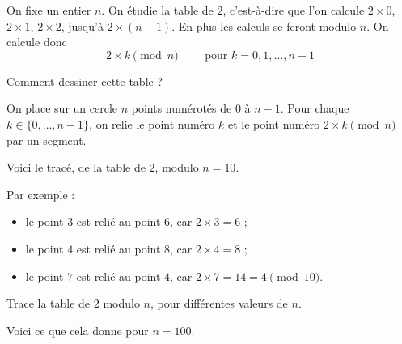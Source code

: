 \documentclass[11pt,class=report,crop=false]{standalone}
\begin{document}
\begin{activite}


On fixe un entier $n$. On étudie la table de $2$, c'est-à-dire 
que l'on calcule $2 \times 0$, $2\times 1$, $2 \times 2$, jusqu'à $2 \times (n-1)$. En plus les calculs se feront modulo $n$. On calcule donc  
$$2 \times k \pmod{n} \qquad \text{ pour } k=0,1,\ldots,n-1$$

Comment dessiner cette table ?

On place sur un cercle $n$ points numérotés de $0$ à $n-1$.
Pour chaque $k\in \{0,\ldots,n-1\}$, on relie le point numéro $k$
et le point numéro $2\times k \pmod{n}$ par un segment. 

Voici le tracé, de la table de $2$, modulo $n=10$.



Par exemple :
\begin{itemize}
  \item le point $3$ est relié au point $6$, car $2 \times 3 = 6$ ;
  \item le point $4$ est relié au point $8$, car $2 \times 4 = 8$ ;
  \item le point $7$ est relié au point $4$, car $2 \times 7 = 14 = 4 \pmod{10}$.
\end{itemize}

\bigskip

Trace la table de $2$ modulo $n$, pour différentes valeurs de $n$.



Voici ce que cela donne pour $n=100$.


\end{activite}
\end{document}
